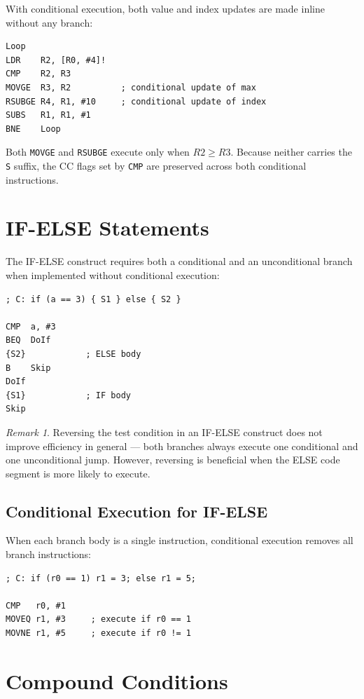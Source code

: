 \documentclass[11pt, a4paper, notitlepage]{report}
\theoremstyle{definition}
\theoremstyle{remark}
\newtheorem{remark}[theorem]{Remark}
\theoremstyle{definition}
\begin{document}
With conditional execution, both value and index updates are made inline without any branch:

\begin{lstlisting}
Loop
LDR    R2, [R0, #4]!
CMP    R2, R3
MOVGE  R3, R2          ; conditional update of max
RSUBGE R4, R1, #10     ; conditional update of index
SUBS   R1, R1, #1
BNE    Loop
\end{lstlisting}

Both \texttt{MOVGE} and \texttt{RSUBGE} execute only when $R2 \ge R3$. Because neither carries the \texttt{S} suffix, the CC flags set by \texttt{CMP} are preserved across both conditional instructions.

\section{IF-ELSE Statements}

The IF-ELSE construct requires both a conditional and an unconditional branch when implemented without conditional execution:

\begin{lstlisting}
; C: if (a == 3) { S1 } else { S2 }

CMP  a, #3
BEQ  DoIf
{S2}            ; ELSE body
B    Skip
DoIf
{S1}            ; IF body
Skip
\end{lstlisting}

\begin{remark}
Reversing the test condition in an IF-ELSE construct does not improve efficiency in general --- both branches always execute one conditional and one unconditional jump. However, reversing is beneficial when the ELSE code segment is more likely to execute.
\end{remark}

\subsection{Conditional Execution for IF-ELSE}

When each branch body is a single instruction, conditional execution removes all branch instructions:

\begin{lstlisting}
; C: if (r0 == 1) r1 = 3; else r1 = 5;

CMP   r0, #1
MOVEQ r1, #3     ; execute if r0 == 1
MOVNE r1, #5     ; execute if r0 != 1
\end{lstlisting}

\section{Compound Conditions}
\end{document}

